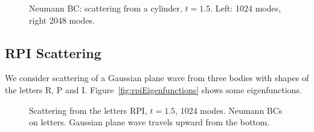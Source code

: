 {
\newcommand{\width}{8cm}
\begin{figure}[htb]
\begin{center}
\end{center}
\caption{Neumann BC: scattering from a cylinder, $t=1.5$. Left: 1024 modes, right 2048 modes.}
\label{fig:cicScatteringNeumann}
\end{figure}
}



\clearpage
\subsection{RPI Scattering}

We consider scattering of a Gaussian plane wave from three bodies with shapes of the letters R, P and I.
Figure~\ref{fig:rpiEigenfunctions} shows some eigenfunctions.

{
\newcommand{\width}{8cm}
\begin{figure}[htb]
\begin{center}
\end{center}
\caption{Scattering from the letters RPI, $t=1.5$, 1024 modes.
    Neumann BCs on letters. Gaussian plane wave travels upward from the bottom.}
\label{fig:rpiScatteringNeumann}
\end{figure}
}

